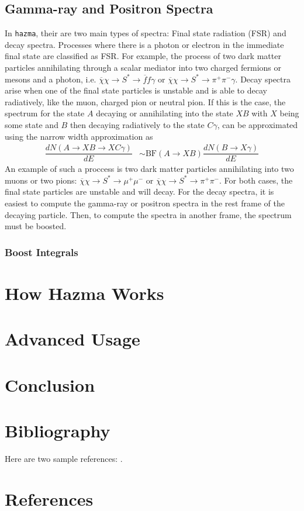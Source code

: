 \subsection{Gamma-ray and Positron Spectra}
In \texttt{hazma}, their are two main types of spectra: Final state radiation (FSR) and decay spectra. Processes where there is a photon or electron in the immediate final state are classified as FSR. For example, the process of two dark matter particles annihilating through a scalar mediator into two charged fermions or mesons and a photon, i.e. \(\overline{\chi}\chi\to S^{*}\to\overline{f}f\gamma\) or \(\overline{\chi}\chi\to S^{*}\to\pi^{+}\pi^{-}\gamma\). Decay spectra arise when one of the final state particles is unstable and is able to decay radiatively, like the muon, charged pion or neutral pion. If this is the case, the spectrum for the state \(A\) decaying or annihilating into the state \(XB\) with \(X\) being some state and \(B\) then decaying radiatively to the state \(C\gamma\), can be approximated using the narrow width approximation as
\begin{align}
	\dfrac{dN(A\to XB\to XC\gamma)}{dE} & \sim \mathrm{BF}(A\to XB)\dfrac{dN(B\to X\gamma)}{dE}
\end{align}
An example of such a proccess is two dark matter particles annihilating into two muons or two pions: \(\overline{\chi}\chi\to S^{*}\to\mu^{+}\mu^{-}\) or \(\overline{\chi}\chi\to S^{*}\to\pi^{+}\pi^{-}\). For both cases, the final state particles are unstable and will decay. For the decay spectra, it is easiest to compute the gamma-ray or positron spectra in the rest frame of the decaying particle. Then, to compute the spectra in another frame, the spectrum must be boosted.
\subsubsection{Boost Integrals}


\section{How Hazma Works}%
\label{sec:how_hazma_works}

\section{Advanced Usage}%
\label{sec:advanced_usage}

\section{Conclusion}%
\label{sec:conclusion}


\section{Bibliography}

Here are two sample references: \cite{Feynman1963118,Dirac1953888}.

\section*{References}




